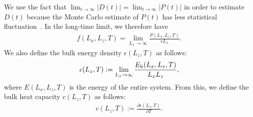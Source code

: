 We use the fact that $\lim_{t\to\infty}|D(t)|=\lim_{t\to\infty}|P(t)|$ in order to estimate $D(t)$ because the Monte Carlo estimate of $P(t)$ has less statistical fluctuation~\cite{Magiera2009a, Magiera2011, Magiera2011b}. In the long-time limit, we therefore have
\begin{align}
f(L_{x}, L_{z}, T)=\lim_{L_{x}\to\infty}\frac{P(L_{x}, L_{z}, T)}{vL_{x}}\label{for:frictionalforce2}.
\end{align}
We also define the bulk energy density $\epsilon(L_{z}, T)$ as follows:
\begin{align}
\epsilon(L_{z}, T):=\lim_{L_{x}\to\infty}\frac{E_{\rm b}(L_{x}, L_{z}, T)}{L_{x}L_{z}},
\end{align}
where $E(L_{x}, L_{z}, T)$ is the energy of the entire system. From this, we define the bulk heat capacity $c(L_{z}, T)$ as follows:
\begin{align}
c(L_{z}, T):=\frac{\partial \epsilon(L_{z}, T)}{\partial T}.
\end{align}